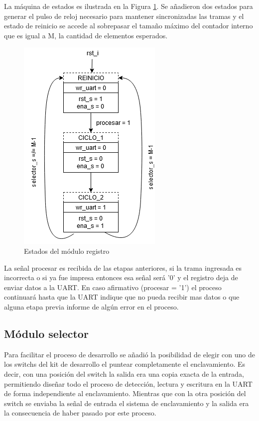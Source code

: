 		La máquina de estados es ilustrada en la Figura \ref{fig:Estado_Registro}. Se añadieron dos estados para generar el pulso de reloj necesario para mantener sincronizadas las tramas y el estado de reinicio se accede al sobrepasar el tamaño máximo del contador interno que es igual a M, la cantidad de elementos esperados.
		
		\begin{figure}[h]
		\centering
			\includegraphics[scale=.9, angle = -90]{./Figures/Estados-Registro}
			\caption{Estados del módulo registro}
			\label{fig:Estado_Registro}
		\end{figure}
		
		
		La señal procesar es recibida de las etapas anteriores, si la trama ingresada es incorrecta o si ya fue impresa entonces esa señal será '0' y el registro deja de enviar datos a la UART. En caso afirmativo (procesar = '1') el proceso continuará hasta que la UART indique que no pueda recibir mas datos o que alguna etapa previa informe de algún error en el proceso.
		
	\subsection{Módulo selector}
	
		Para facilitar el proceso de desarrollo se añadió la posibilidad de elegir con uno de los switchs del kit de desarrollo el puntear completamente el enclavamiento. Es decir, con una posición del switch la salida era una copia exacta de la entrada, permitiendo diseñar todo el proceso de detección, lectura y escritura en la UART de forma independiente al enclavamiento. Mientras que con la otra posición del switch se enviaba la señal de entrada el sistema de enclavamiento y la salida era la consecuencia de haber pasado por este proceso.
		
